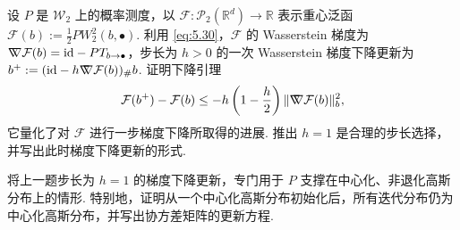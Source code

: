 \begin{exercise}\label{exer:8.5}
设 $P$ 是 $\mathcal W_2$ 上的概率测度，以 $\mathcal F:\mathcal P_2(\mathbb R^d)\to\mathbb R$ 表示重心泛函 $\mathcal F(b):=\frac12PW_2^2(b,\bullet)$. 利用 \eqref{eq:5.30}，$\mathcal F$ 的 Wasserstein 梯度为 $\nabla\mkern-10mu\nabla\mathcal F(b)=\mathrm{id}-PT_{b\to\bullet}$，步长为 $h>0$ 的一次 Wasserstein 梯度下降更新为 $b^+:=(\mathrm{id}-h\nabla\mkern-10mu\nabla\mathcal F(b))_\#b$. 证明下降引理
$$\mathcal F(b^+)-\mathcal F(b)\le-h\left(1-\frac h2\right)
\|\nabla\mkern-10mu\nabla\mathcal F(b)\|_b^2,$$
它量化了对 $\mathcal F$ 进行一步梯度下降所取得的进展. 推出 $h=1$ 是合理的步长选择，并写出此时梯度下降更新的形式.
\end{exercise}

\begin{exercise}\label{exer:8.6}
将上一题步长为 $h=1$ 的梯度下降更新，专门用于 $P$ 支撑在中心化、非退化高斯分布上的情形. 特别地，证明从一个中心化高斯分布初始化后，所有迭代分布仍为中心化高斯分布，并写出协方差矩阵的更新方程.
\end{exercise}
